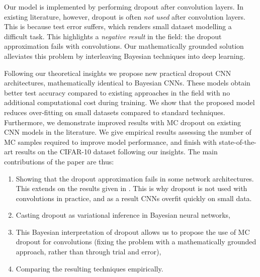 Our model is implemented by performing dropout after convolution layers. In existing literature, however, dropout is often \textit{not used} after convolution layers. This is because test error suffers, which renders small dataset modelling a difficult task. 
This highlights a \textit{negative result} in the field: the dropout approximation fails with convolutions. %
Our mathematically grounded solution alleviates this problem by interleaving Bayesian techniques into deep learning. 

Following our theoretical insights we propose new practical dropout CNN architectures, mathematically identical to Bayesian CNNs. These models obtain better test accuracy compared to existing approaches in the field with no additional computational cost during training. %
We show that the proposed model reduces over-fitting on small datasets compared to standard techniques. Furthermore, we demonstrate improved results with MC dropout on existing CNN models in the literature. %
We give empirical results assessing the number of MC samples required to improve model performance, and finish with state-of-the-art results on the CIFAR-10 dataset following our insights. 
The main contributions of the paper are thus: 
\begin{enumerate}
\item
Showing that the dropout approximation fails in some network architectures. This extends on the results given in \citep{srivastava2014dropout}. 
This is why dropout is not used with convolutions in practice, and as a result CNNs overfit quickly on small data.
\item
Casting dropout as variational inference in Bayesian neural networks, %
\item
This Bayesian interpretation of dropout allows us to propose the use of MC dropout for convolutions (fixing the problem with a mathematically grounded approach, rather than through trial and error), 
\item
Comparing the resulting techniques empirically.
\end{enumerate}



